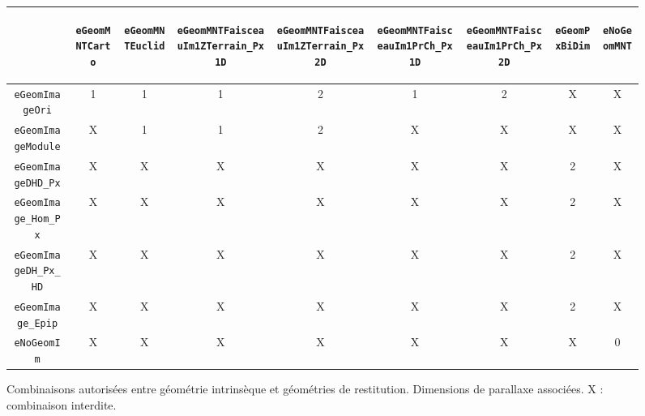 \begin{figure}
\vspace{4cm}
\begin{tabular} { c  c  c  c c c c c  c} 
              & \hspace{1mm} \begin{rotate}{45} {\tt eGeomMNTCarto} \end{rotate}   
              & \hspace{1mm} \begin{rotate}{45} {\tt eGeomMNTEuclid} \end{rotate} 
              & \hspace{1mm} \begin{rotate}{45} {\tt eGeomMNTFaisceauIm1ZTerrain\_Px1D} \end{rotate} 
              & \hspace{1mm} \begin{rotate}{45} {\tt eGeomMNTFaisceauIm1ZTerrain\_Px2D} \end{rotate} 
              & \hspace{1mm} \begin{rotate}{45} {\tt eGeomMNTFaisceauIm1PrCh\_Px1D} \end{rotate} 
              & \hspace{1mm} \begin{rotate}{45} {\tt eGeomMNTFaisceauIm1PrCh\_Px2D} \end{rotate} 
              & \hspace{1mm} \begin{rotate}{45} {\tt eGeomPxBiDim} \end{rotate} 
              & \hspace{1mm} \begin{rotate}{45} {\tt eNoGeomMNT} \end{rotate} \\  \hline
          {\tt eGeomImageOri} & 1 & 1 & 1 & 2  & 1 & 2 & X & X \\  \hline
          {\tt eGeomImageModule} & X & 1 & 1 & 2  & X & X & X & X \\  \hline
          {\tt eGeomImageDHD\_Px} & X & X & X & X  & X & X & 2 & X \\  \hline
          {\tt eGeomImage\_Hom\_Px} & X & X & X & X  & X & X & 2 & X \\  \hline
          {\tt eGeomImageDH\_Px\_HD} & X & X & X & X  & X & X & 2 & X \\  \hline
          {\tt eGeomImage\_Epip} & X & X & X & X  & X & X & 2 & X \\  \hline
          {\tt eNoGeomIm} & X & X & X & X  & X & X & X & 0 \\  \hline
\end{tabular}
\caption {Combinaisons autoris\'ees entre g\'eom\'etrie intrins\`eque et
g\'eom\'etries de restitution. Dimensions de parallaxe associ\'ees. X : combinaison interdite.}
\label{TAB:COMB:GEOM}
\end{figure}

